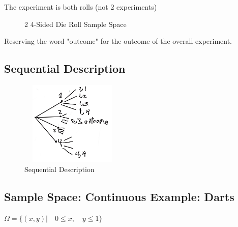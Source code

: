 \documentclass{article}
\begin{document}
{}
The experiment is both rolls (not 2 experiments)

% 
\begin{figure}[ht]
\centering

\caption{2 4-Sided Die Roll Sample Space}
\end{figure}


Reserving the word "outcome" for the outcome of the overall experiment.

\subsection{Sequential Description}

\begin{figure}[ht]
\centering
\includegraphics[width=5cm, height=4cm]{images/L01/sequential_desc.jpeg}
\caption{Sequential Description}
\end{figure}

\subsection{Sample Space: Continuous Example: Darts}

$\Omega = \{(x,y) | \quad 0 \le x, \quad y \le 1 \}$
\end{document}
